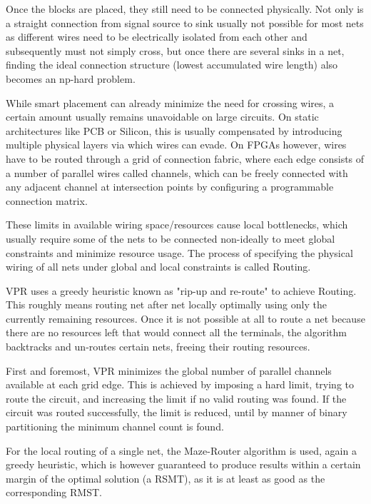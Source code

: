 Once the blocks are placed, they still need to be connected physically. Not only is a straight connection from signal source to sink usually not possible for most nets as different wires need to be electrically isolated from each other and subsequently must not simply cross, but once there are several sinks in a net, finding the ideal connection structure (lowest accumulated wire length) also becomes an np-hard problem\cite{rsmt-complexity}.

While smart placement can already minimize the need for crossing wires, a certain amount usually remains unavoidable on large circuits. On static architectures like \gls{PCB} or Silicon, this is usually compensated by introducing multiple physical layers via which wires can evade. On \glspl{FPGA} however, wires have to be routed through a grid of connection fabric, where each edge consists of a number of parallel wires called channels, which can be freely connected with any adjacent channel at intersection points by configuring a programmable connection matrix.

These limits in available wiring space/resources cause local bottlenecks, which usually require some of the nets to be connected non-ideally to meet global constraints and minimize resource usage. The process of specifying the physical wiring of all nets under global and local constraints is called Routing.

\gls{VPR} uses a greedy heuristic known as "rip-up and re-route" to achieve Routing. This roughly means routing net after net locally optimally using only the currently remaining resources. Once it is not possible at all to route a net because there are no resources left that would connect all the terminals, the algorithm backtracks and un-routes certain nets, freeing their routing resources.\cite{vtr8}

First and foremost, \gls{VPR} minimizes the global number of parallel channels available at each grid edge. This is achieved by imposing a hard limit, trying to route the circuit, and increasing the limit if no valid routing was found. If the circuit was routed successfully, the limit is reduced, until by manner of binary partitioning the minimum channel count is found.

For the local routing of a single net, the Maze-Router\cite{Maze-Router} algorithm is used, again a greedy heuristic, which is however guaranteed to produce results within a certain margin of the optimal solution (a \gls{RSMT}), as it is at least as good as the corresponding \gls{RMST}.\cite{rmst-quality}

